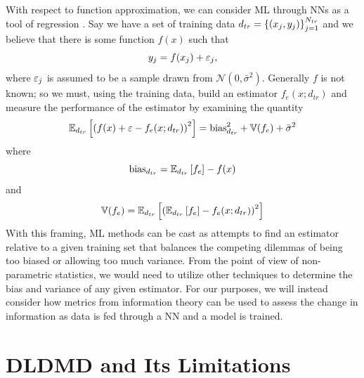 With respect to function approximation, we can consider ML through NNs
as a tool of regression \cite{oreilly, theodoridis}. 
Say we have a set of training data $d_{tr} = \left\{(x_j, y_j)\right\}_{j=1}^{N_{tr}}$ 
and we believe that there is some function $f(x)$ such that 
\begin{equation}
    y_j = f(x_j) + \varepsilon_j,    
\end{equation}
where $\varepsilon_j$ is assumed to be a sample drawn from $\mathcal{N}(0, \bar{\sigma}^2)$. 
Generally $f$ is not known; so we must, using the training data, build an estimator 
$f_e(x; d_{tr})$ and measure the performance of the estimator by examining the quantity
\begin{equation}
    \mathbb{E}_{d_{tr}}\left[\left(f(x) + \varepsilon - f_e(x;d_{tr})\right)^2\right] = 
    \text{bias}_{d_{tr}}^2 + \mathbb{V}(f_e) + \bar{\sigma}^2
\end{equation}
where 
\begin{equation}
    \text{bias}_{d_{tr}} = \mathbb{E}_{d_{tr}}\left[f_e\right] - f(x)
\end{equation}
and 
\begin{equation}
    \mathbb{V}(f_e) = \mathbb{E}_{d_{tr}}\left[\left(\mathbb{E}_{d_{tr}}
    \left[f_e\right] - f_e(x; d_{tr})\right)^2\right]
\end{equation}
With this framing, ML methods can be cast as attempts to find an estimator relative to
a given training set that balances the competing dilemmas of being too biased or allowing too
much variance. From the point of view of non-parametric statistics, we would need to utilize 
other techniques \cite{hollander} to determine the bias and variance of any given estimator. 
For our purposes, 
we will instead consider how metrics from information theory can be used to assess the change in 
information as data is fed through a NN and a model is trained.

\section{DLDMD and Its Limitations}

